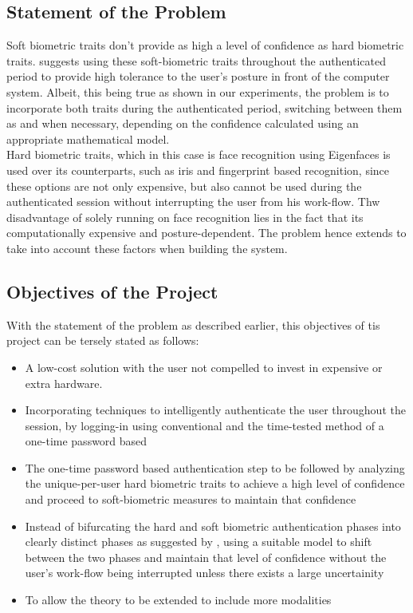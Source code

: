 \documentclass[12pt]{article}			%
\begin{document}
\subsection{ Statement of the Problem }
Soft biometric traits don't provide as high a level of confidence as hard biometric traits. \cite{Niin10} suggests using these soft-biometric traits throughout the authenticated period to provide high tolerance to the user's posture in front of the computer system. Albeit, this being true as shown in our experiments, the problem is to incorporate both traits during the authenticated period, switching between them as and when necessary, depending on the confidence calculated using an appropriate mathematical model. \\
Hard biometric traits, which in this case is face recognition using Eigenfaces\cite{Turk91} is used over its counterparts, such as iris and fingerprint based recognition, since these options are not only expensive, but also cannot be used during the authenticated session without interrupting the user from his work-flow. Thw disadvantage of solely running on face recognition lies in the fact that its computationally expensive and posture-dependent. The problem hence extends to take into account these factors when building the system.

\subsection{ Objectives of the Project }
With the statement of the problem as described earlier, this objectives of tis project can be tersely stated as follows:
\begin{itemize}
\item A low-cost solution with the user not compelled to invest in expensive or extra hardware.
\item Incorporating techniques to intelligently authenticate the user throughout the session, by logging-in using conventional and the time-tested method of a one-time password based
\item The one-time password based authentication step to be followed by analyzing the unique-per-user hard biometric traits to achieve a high level of confidence and proceed to soft-biometric measures to maintain that confidence
\item Instead of bifurcating the hard and soft biometric authentication phases into clearly distinct phases as suggested by \cite{Niin10}, using a suitable model to shift between the two phases and maintain that level of confidence without the user's work-flow being interrupted unless there exists a large uncertainity
\item To allow the theory to be extended to include more modalities
\end{itemize}
\end{document}
